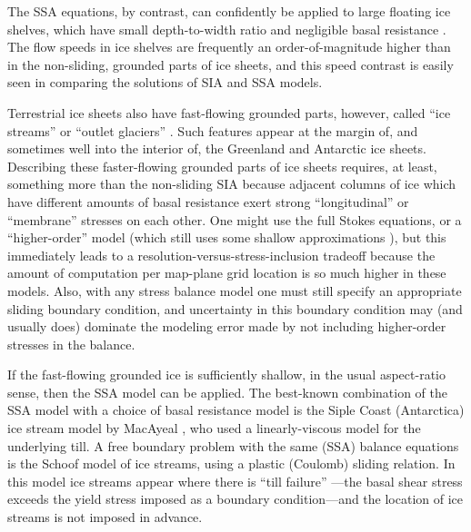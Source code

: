 \documentclass[titlepage,letterpaper,final]{scrartcl}
\begin{document}
The SSA equations, by contrast, can confidently be applied to large floating ice shelves, which have small depth-to-width ratio and negligible basal resistance \cite{Morland,MorlandZainuddin}.  The flow speeds in ice shelves are frequently an order-of-magnitude higher than in the non-sliding, grounded parts of ice sheets, and this speed contrast is easily seen in comparing the solutions of SIA and SSA models.

Terrestrial ice sheets also have fast-flowing grounded parts, however, called ``ice streams'' or ``outlet glaciers'' \cite{TrufferEchelmeyer}.  Such features appear at the margin of, and sometimes well into the interior of, the Greenland \cite{Joughinetal2001} and Antarctic \cite{BamberVaughanJoughin} ice sheets.  Describing these faster-flowing grounded parts of ice sheets requires, at least, something more than the non-sliding SIA because adjacent columns of ice which have different amounts of basal resistance exert strong ``longitudinal'' or ``membrane'' stresses \cite{SchoofStream} on each other.  One might use the full Stokes equations, or a ``higher-order'' model (which still uses some shallow approximations \cite{Blatter,Pattyn03}), but this immediately leads to a resolution-versus-stress-inclusion tradeoff because the amount of computation per map-plane grid location is so much higher in these models.  Also, with any stress balance model one must still specify an appropriate sliding boundary condition, and uncertainty in this boundary condition may (and usually does) dominate the modeling error made by not including higher-order stresses in the balance.

If the fast-flowing grounded ice is sufficiently shallow, in the usual aspect-ratio sense, then the SSA model can be applied.  The best-known combination of the SSA model with a choice of basal resistance model is the Siple Coast (Antarctica) ice stream model by MacAyeal \cite{MacAyeal}, who used a linearly-viscous model for the underlying till.  A free boundary problem with the same (SSA) balance equations is the Schoof \cite{SchoofStream} model of ice streams, using a plastic (Coulomb) sliding relation.  In this model ice streams appear where there is ``till failure'' \cite{Paterson}---the basal shear stress exceeds the yield stress imposed as a boundary condition---and the location of ice streams is not imposed in advance.
\end{document}
